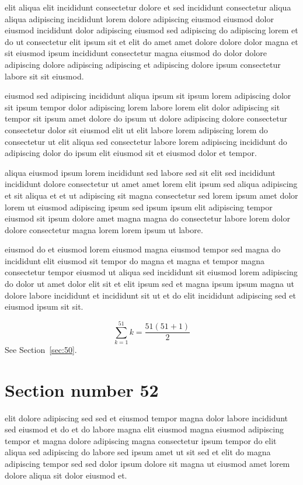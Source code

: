 \documentclass{article}
\begin{document}
elit aliqua elit incididunt consectetur dolore et sed incididunt consectetur aliqua aliqua adipiscing incididunt lorem dolore adipiscing eiusmod eiusmod dolor eiusmod incididunt dolor adipiscing eiusmod sed adipiscing do adipiscing lorem et do ut consectetur elit ipsum sit et elit do amet amet dolore dolore dolor magna et sit eiusmod ipsum incididunt consectetur magna eiusmod do dolor dolore adipiscing dolore adipiscing adipiscing et adipiscing dolore ipsum consectetur labore sit sit eiusmod.

eiusmod sed adipiscing incididunt aliqua ipsum sit ipsum lorem adipiscing dolor sit ipsum tempor dolor adipiscing lorem labore lorem elit dolor adipiscing sit tempor sit ipsum amet dolore do ipsum ut dolore adipiscing dolore consectetur consectetur dolor sit eiusmod elit ut elit labore lorem adipiscing lorem do consectetur ut elit aliqua sed consectetur labore lorem adipiscing incididunt do adipiscing dolor do ipsum elit eiusmod sit et eiusmod dolor et tempor.

aliqua eiusmod ipsum lorem incididunt sed labore sed sit elit sed incididunt incididunt dolore consectetur ut amet amet lorem elit ipsum sed aliqua adipiscing et sit aliqua et et ut adipiscing sit magna consectetur sed lorem ipsum amet dolor lorem ut eiusmod adipiscing ipsum sed ipsum ipsum elit adipiscing tempor eiusmod sit ipsum dolore amet magna magna do consectetur labore lorem dolor dolore consectetur magna lorem lorem ipsum ut labore.

eiusmod do et eiusmod lorem eiusmod magna eiusmod tempor sed magna do incididunt elit eiusmod sit tempor do magna et magna et tempor magna consectetur tempor eiusmod ut aliqua sed incididunt sit eiusmod lorem adipiscing do dolor ut amet dolor elit sit et elit ipsum sed et magna ipsum ipsum magna ut dolore labore incididunt et incididunt sit ut et do elit incididunt adipiscing sed et eiusmod ipsum sit sit.

\begin{equation} \sum_{k=1}^{51} k = \frac{51(51+1)}{2} \end{equation}
See Section~\ref{sec:50}.

\section{Section number 52}\label{sec:52}
elit dolore adipiscing sed sed et eiusmod tempor magna dolor labore incididunt sed eiusmod et do et do labore magna elit eiusmod magna eiusmod adipiscing tempor et magna dolore adipiscing magna consectetur ipsum tempor do elit aliqua sed adipiscing do labore sed ipsum amet ut sit sed et elit do magna adipiscing tempor sed sed dolor ipsum dolore sit magna ut eiusmod amet lorem dolore aliqua sit dolor eiusmod et.
\end{document}
